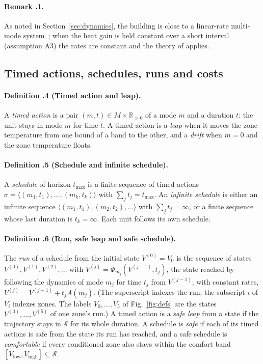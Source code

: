 \documentclass[10pt,a4paper,twocolumn]{article}
\theoremstyle{definition}
\begin{document}
\paragraph{Remark \thesection.1.} As noted in Section~\ref{sec:dynamics}, the building is close to a linear-rate multi-mode system~\citep{wojtczak2013optimal}; when the heat gain is held constant over a short interval (assumption A3) the rates are constant and the theory of \citet{alur2012optimal} applies.

\subsection{Timed actions, schedules, runs and costs}
\paragraph{Definition \thesection.4 (Timed action and leap).} A \emph{timed action} is a pair $(m,t)\in M\times\mathbb{R}_{>0}$ of a mode $m$ and a duration $t$: the unit stays in mode $m$ for time $t$. A timed action is a \emph{leap} when it moves the zone temperature from one bound of a band to the other, and a \emph{drift} when $m=0$ and the zone temperature floats.

\paragraph{Definition \thesection.5 (Schedule and infinite schedule).} A \emph{schedule} of horizon $t_{\max}$ is a finite sequence of timed actions $\sigma=\langle(m_1,t_1),\dots,(m_k,t_k)\rangle$ with $\sum_jt_j=t_{\max}$. An \emph{infinite schedule} is either an infinite sequence $\langle(m_1,t_1),(m_2,t_2),\dots\rangle$ with $\sum_jt_j=\infty$, or a finite sequence whose last duration is $t_k=\infty$. Each unit follows its own schedule.

\paragraph{Definition \thesection.6 (Run, safe leap and safe schedule).} The \emph{run} of a schedule from the initial state $V^{(0)}=V_0$ is the sequence of states $V^{(0)},V^{(1)},V^{(2)},\dots$ with $V^{(j)}=\Phi_{m_j}(V^{(j-1)},t_j)$, the state reached by following the dynamics of mode $m_j$ for time $t_j$ from $V^{(j-1)}$; with constant rates, $V^{(j)}=V^{(j-1)}+t_jA(m_j)$. (The superscript indexes the run; the subscript $i$ of $V_i$ indexes zones. The labels $V_0,\dots,V_5$ of Fig.~\ref{fig:defs} are the states $V^{(0)},\dots,V^{(5)}$ of one zone's run.) A timed action is a \emph{safe leap} from a state if the trajectory stays in $\mathcal{S}$ for its whole duration. A schedule is \emph{safe} if each of its timed actions is safe from the state its run has reached, and a safe schedule is \emph{comfortable} if every conditioned zone also stays within the comfort band $[V_{\text{low}},V_{\text{high}}]\subseteq\mathcal{S}$.
\end{document}
